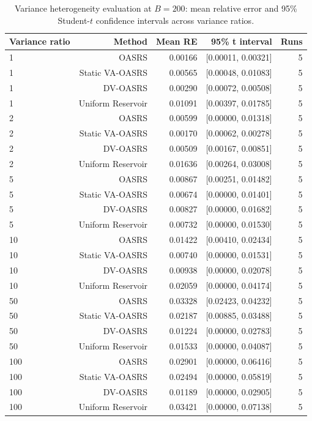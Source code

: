\documentclass[conference]{IEEEtran}
\begin{document}
\begin{table}[!t]
\centering
\caption{Variance heterogeneity evaluation at $B=200$: mean relative error and 95\% Student-$t$ confidence intervals across variance ratios.}
\label{tab:variance_heterogeneity}
\small
\begin{tabular}{lrrrr}
\toprule
\textbf{Variance ratio} & \textbf{Method} & \textbf{Mean RE} & \textbf{95\% t interval} & \textbf{Runs} \\
\midrule
1 & OASRS & 0.00166 & [0.00011, 0.00321] & 5 \\
1 & Static VA-OASRS & 0.00565 & [0.00048, 0.01083] & 5 \\
1 & DV-OASRS & 0.00290 & [0.00072, 0.00508] & 5 \\
1 & Uniform Reservoir & 0.01091 & [0.00397, 0.01785] & 5 \\
2 & OASRS & 0.00599 & [0.00000, 0.01318] & 5 \\
2 & Static VA-OASRS & 0.00170 & [0.00062, 0.00278] & 5 \\
2 & DV-OASRS & 0.00509 & [0.00167, 0.00851] & 5 \\
2 & Uniform Reservoir & 0.01636 & [0.00264, 0.03008] & 5 \\
5 & OASRS & 0.00867 & [0.00251, 0.01482] & 5 \\
5 & Static VA-OASRS & 0.00674 & [0.00000, 0.01401] & 5 \\
5 & DV-OASRS & 0.00827 & [0.00000, 0.01682] & 5 \\
5 & Uniform Reservoir & 0.00732 & [0.00000, 0.01530] & 5 \\
10 & OASRS & 0.01422 & [0.00410, 0.02434] & 5 \\
10 & Static VA-OASRS & 0.00740 & [0.00000, 0.01531] & 5 \\
10 & DV-OASRS & 0.00938 & [0.00000, 0.02078] & 5 \\
10 & Uniform Reservoir & 0.02059 & [0.00000, 0.04174] & 5 \\
50 & OASRS & 0.03328 & [0.02423, 0.04232] & 5 \\
50 & Static VA-OASRS & 0.02187 & [0.00885, 0.03488] & 5 \\
50 & DV-OASRS & 0.01224 & [0.00000, 0.02783] & 5 \\
50 & Uniform Reservoir & 0.01533 & [0.00000, 0.04087] & 5 \\
100 & OASRS & 0.02901 & [0.00000, 0.06416] & 5 \\
100 & Static VA-OASRS & 0.02494 & [0.00000, 0.05819] & 5 \\
100 & DV-OASRS & 0.01189 & [0.00000, 0.02905] & 5 \\
100 & Uniform Reservoir & 0.03421 & [0.00000, 0.07138] & 5 \\
\bottomrule
\end{tabular}
\end{table}
\end{document}

